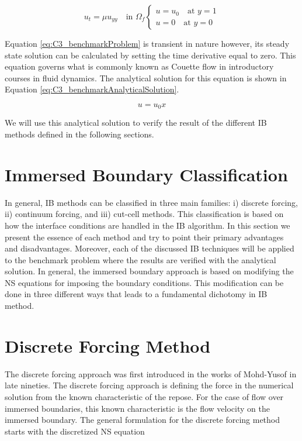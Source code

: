 \begin{subequations}\label{eq:C3_benchmarkProblem}
\begin{equation}
	u_t = \mu u_{yy} \quad \text{in } \Omega_f
\end{equation}
\begin{equation}
\begin{cases}
	u = u_0 \quad \text{at } y = 1 \\
	u = 0 \quad \text{at } y = 0
\end{cases}
\end{equation}
\end{subequations}

Equation \eqref{eq:C3_benchmarkProblem} is transient in nature however, its steady state solution can be calculated by setting the time derivative equal to zero. This equation governs what is commonly known as Couette flow in introductory courses in fluid dynamics. The analytical solution for this equation is shown in Equation \eqref{eq:C3_benchmarkAnalyticalSolution}.

\begin{equation}\label{eq:C3_benchmarkAnalyticalSolution}
	u = u_0 x
\end{equation}

We will use this analytical solution to verify the result of the different IB methods defined in the following sections.

\section{Immersed Boundary Classification}
In general, IB methods can be classified in three main families: i) discrete forcing, ii) continuum forcing, and iii) cut-cell methods. This classification is based on how the interface conditions are handled in the IB algorithm. In this section we present the essence of each method and try to point their primary advantages and disadvantages. Moreover, each of the discussed IB techniques will be applied to the benchmark problem where the results are verified with the analytical solution. In general, the immersed boundary approach is based on modifying the NS equations for imposing the boundary conditions. This modification can be done in three different ways that leads to a fundamental dichotomy in IB method.

\section{Discrete Forcing Method}
The discrete forcing approach was first introduced in the works of Mohd-Yusof \cite{mohd1997combined} in late nineties. The discrete forcing approach is defining the force in the numerical solution from the known characteristic of the repose. For the case of flow over immersed boundaries, this known characteristic is the flow velocity on the immersed boundary. The general formulation for the discrete forcing method starts with the discretized NS equation

